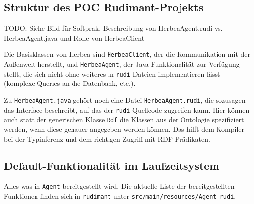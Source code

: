 
\subsection{Struktur des POC Rudimant-Projekts}

TODO: Siehe Bild für Softprak, Beschreibung von HerbeaAgent.rudi
vs. HerbeaAgent.java und Rolle von HerbeaClient

Die Basisklassen von Herbea sind \texttt{HerbeaClient}, der die Kommunikation
mit der Außenwelt herstellt, und \texttt{HerbeaAgent}, der Java-Funktionalität
zur Verfügung stellt, die sich nicht ohne weiteres in \texttt{rudi} Dateien
implementieren lässt (komplexe Queries an die Datenbank, etc.).

Zu \texttt{HerbeaAgent.java} gehört noch eine Datei \texttt{HerbeaAgent.rudi},
die sozusagen das Interface beschreibt, auf das der \texttt{rudi} Quellcode
zugreifen kann. Hier können auch statt der generischen Klasse \texttt{Rdf} die
Klassen aus der Ontologie spezifiziert werden, wenn diese genauer angegeben
werden können. Das hilft dem Kompiler bei der Typinferenz und dem richtigen
Zugriff mit RDF-Prädikaten.

\subsection{Default-Funktionalität im Laufzeitsystem}
Alles was in \texttt{Agent} bereitgestellt wird. Die aktuelle Liste der
bereitgestellten Funktionen finden sich in \texttt{rudimant} unter
\texttt{src/main/resources/Agent.rudi}.

